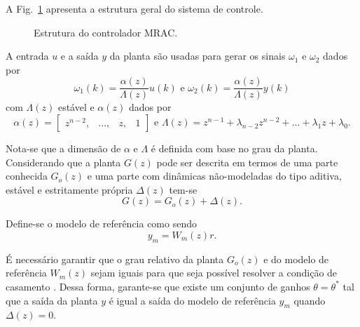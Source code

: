   A Fig.~\ref{fig:cascata} apresenta a estrutura geral do sistema de controle.

  \begin{figure}[htb]
    \renewcommand\figurename{Fig.}
    \caption{Estrutura do controlador MRAC.}
    \label{fig:cascata}
  \end{figure}

  A entrada $u$ e a saída $y$ da planta são usadas para gerar os sinais $\omega_1$ e $\omega_2$ dados por
  \begin{equation}
      \omega_1(k) = \frac{\alpha(z)}{\Lambda(z)} u(k) \text{ e }
      \omega_2(k) = \frac{\alpha(z)}{\Lambda(z)} y(k)
    \label{eq:omega_1_2}
  \end{equation}
  com $\Lambda(z)$ estável e $\alpha(z)$ dados por
  \begin{equation*}
    \alpha(z) = \left[ \begin{matrix} z^{n-2}, & ..., & z, & 1 \end{matrix} \right]
    \text{ e }
    \Lambda(z) = z^{n-1} + \lambda_{n-2} z^{n-2} + ... + \lambda_1 z + \lambda_0\text{.}
  \end{equation*}

  Nota-se que a dimensão de $\alpha$ e $\Lambda$ é definida com base no grau da planta. Considerando que a planta $G(z)$ pode ser descrita em termos de uma parte conhecida $G_o(z)$ e uma parte com dinâmicas não-modeladas do tipo aditiva, estável e estritamente própria $\Delta(z)$ tem-se
  \begin{equation}
    G(z) = G_o(z) + \Delta(z) \text{.}
    \label{eq:planta_go_delta}
  \end{equation}

  Define-se o modelo de referência como sendo
  \begin{equation*}
    y_m = W_m(z) r \text{.}
  \end{equation*}

  É necessário garantir que o grau relativo da planta $G_o(z)$ e do modelo de referência $W_m(z)$ sejam iguais para que seja possível resolver a condição de casamento \cite{ref:IOANNOU}. Dessa forma, garante-se que existe um conjunto de ganhos $\theta = \theta^*$ tal que a saída da planta $y$ é igual a saída do modelo de referência $y_m$ quando $\Delta(z) = 0$.

